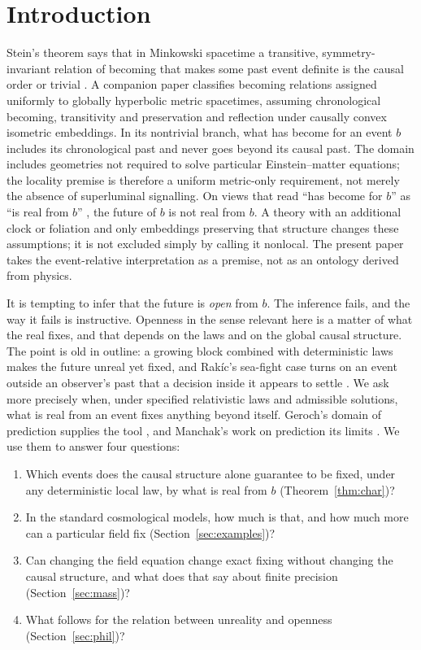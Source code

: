 \documentclass[11pt]{article}
\theoremstyle{definition}
\begin{document}
\section{Introduction}

Stein's theorem says that in Minkowski spacetime a transitive,
symmetry-invariant relation of becoming that makes some past event definite
is the causal order or trivial \citep{Stein1968,Stein1991,CH1995}. A
companion paper \citep{SteinGR} classifies becoming relations assigned uniformly
to globally hyperbolic metric spacetimes, assuming chronological becoming,
transitivity and preservation and reflection under causally convex isometric
embeddings. In its nontrivial branch, what has become for an event $b$
includes its chronological past and never goes beyond its causal past.
The domain includes geometries not required to solve particular Einstein--matter
equations; the locality premise is therefore a uniform metric-only requirement,
not merely the absence of superluminal signalling. On views that read
``has become for $b$'' as ``is real from $b$'' \citep{Fine2005,Lipman2023},
the future of $b$ is not real from $b$. A theory with an additional clock or
foliation and only embeddings preserving that structure changes these
assumptions; it is not excluded simply by calling it nonlocal. The present
paper takes the event-relative interpretation as a premise, not as an ontology
derived from physics.

It is tempting to infer that the future is \emph{open} from $b$. The
inference fails, and the way it fails is instructive. Openness in the sense
relevant here is a matter of what the real fixes, and that depends on the
laws and on the global causal structure. The point is old in outline: a
growing block \citep{Broad1923} combined with deterministic laws makes the
future unreal yet fixed, and Rak\'ic's sea-fight case turns on an event
outside an observer's past that a decision inside it appears to settle
\citep{Rakic1997}. We ask more precisely when, under specified relativistic
laws and admissible solutions, what is real from an event fixes anything
beyond itself.
Geroch's domain of prediction supplies the tool \citep{Geroch1977}, and
Manchak's work on prediction its limits \citep{Manchak2008}. We use them to
answer four questions:
\begin{enumerate}
\item Which events does the causal structure alone guarantee to be fixed,
under any deterministic local law, by what is real from $b$
(Theorem~\ref{thm:char})?
\item In the standard cosmological models, how much is that, and how much
more can a particular field fix (Section~\ref{sec:examples})?
\item Can changing the field equation change exact fixing without changing
the causal structure, and what does that say about finite precision
(Section~\ref{sec:mass})?
\item What follows for the relation between unreality and openness
(Section~\ref{sec:phil})?
\end{enumerate}
\end{document}
